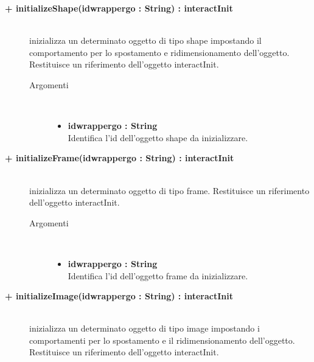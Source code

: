 \begin{description}
\begin{description}
\begin{description}
\begin{itemize}
				\end{itemize}
		\end{description}
	\end{description}	
	
\begin{description}
		\item[\textbf{\color{blue}+ initializeShape(idwrappergo : String) : interactInit			}] \hfill \\
			inizializza un determinato oggetto di tipo shape impostando il comportamento per lo spostamento e ridimensionamento dell'oggetto. Restituisce un riferimento dell'oggetto interactInit.
			
		\begin{description}
			\item[Argomenti] \hfill \\
				\begin{itemize}
				
					\item \textbf{idwrappergo : String			} \hfill \\
						Identifica l'id dell'oggetto shape da inizializzare.
					
				\end{itemize}
		\end{description}
	\end{description}	

\begin{description}
		\item[\textbf{\color{blue}+ initializeFrame(idwrappergo : String) : interactInit			}] \hfill \\
			inizializza un determinato oggetto di tipo frame. Restituisce un riferimento dell'oggetto interactInit.
			
		\begin{description}
			\item[Argomenti] \hfill \\
				\begin{itemize}
				
					\item \textbf{idwrappergo : String			} \hfill \\
						Identifica l'id dell'oggetto frame da inizializzare.
					
				\end{itemize}
		\end{description}
	\end{description}
	
\begin{description}
		\item[\textbf{\color{blue}+ initializeImage(idwrappergo : String) : interactInit			}] \hfill \\
			inizializza un determinato oggetto di tipo image impostando i comportamenti per lo spostamento e il ridimensionamento dell'oggetto. Restituisce un riferimento dell'oggetto interactInit.
			

\end{description}
\end{description}
